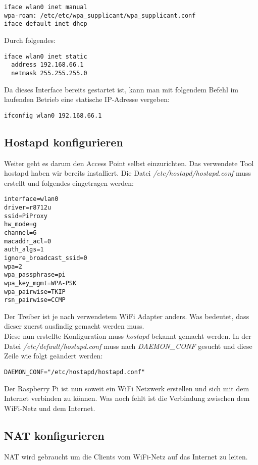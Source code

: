 \begin{lstlisting}
iface wlan0 inet manual
wpa-roam: /etc/etc/wpa_supplicant/wpa_supplicant.conf
iface default inet dhcp
\end{lstlisting}

Durch folgendes:

\begin{lstlisting}
iface wlan0 inet static
  address 192.168.66.1
  netmask 255.255.255.0
\end{lstlisting}

Da dieses Interface bereits gestartet ist, kann man mit folgendem Befehl im laufenden Betrieb eine statische IP-Adresse vergeben:

\begin{lstlisting}
ifconfig wlan0 192.168.66.1
\end{lstlisting}

\subsection{Hostapd konfigurieren}
Weiter geht es darum den Access Point selbst einzurichten. Das verwendete Tool hostapd haben wir bereits installiert.
Die Datei \textit{/etc/hostapd/hostapd.conf} muss erstellt und folgendes eingetragen werden:

\begin{lstlisting}
interface=wlan0
driver=r8712u
ssid=PiProxy
hw_mode=g
channel=6
macaddr_acl=0
auth_algs=1
ignore_broadcast_ssid=0
wpa=2
wpa_passphrase=pi
wpa_key_mgmt=WPA-PSK
wpa_pairwise=TKIP
rsn_pairwise=CCMP
\end{lstlisting}

Der Treiber ist je nach verwendetem WiFi Adapter anders. Was bedeutet, dass dieser zuerst ausfindig gemacht werden muss. \\

Diese nun erstellte Konfiguration muss \textit{hostapd} bekannt gemacht werden. In der Datei \textit{/etc/default/hostapd.conf} muss nach \textit{DAEMON\_CONF} gesucht und diese Zeile wie folgt geändert werden:

\begin{lstlisting}
DAEMON_CONF="/etc/hostapd/hostapd.conf"
\end{lstlisting}

Der Raspberry Pi ist nun soweit ein WiFi Netzwerk erstellen und sich mit dem Internet verbinden zu können. Was noch fehlt ist die Verbindung zwischen dem WiFi-Netz und dem Internet.

\subsection{NAT konfigurieren}
NAT wird gebraucht um die Clients vom WiFi-Netz auf das Internet zu leiten.

